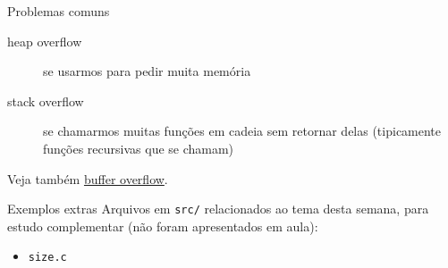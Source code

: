 \documentclass{beamer}
\begin{document}
\begin{frame}{Problemas comuns}

  \begin{description}
  \item[heap overflow] se usarmos  para pedir muita memória
  \item[stack overflow] se chamarmos muitas funções em cadeia sem
    retornar delas (tipicamente funções recursivas que se chamam)
  \end{description}

  Veja também \href{https://en.wikipedia.org/wiki/Buffer_overflow}{buffer overflow}.
   
\end{frame}

\begin{frame}{Exemplos extras}
  Arquivos em \texttt{src/} relacionados ao tema desta semana, para
  estudo complementar (não foram apresentados em aula):
  \begin{itemize}
    \item \texttt{size.c}
  \end{itemize}
\end{frame}
\end{document}
